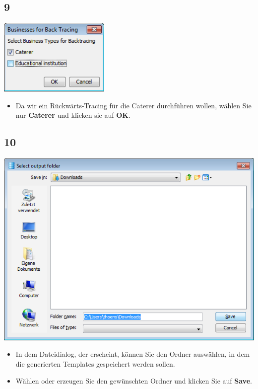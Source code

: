 \documentclass{beamer}
\begin{document}
\subsection{9}
\begin{frame}
	\begin{center}
  		\includegraphics[width=0.4\textwidth]{9.png}
	\end{center}
	\begin{itemize}
		\item Da wir ein Rückwärts-Tracing für die Caterer durchführen wollen, wählen Sie nur \textbf{Caterer} und klicken sie auf \textbf{OK}.
	\end{itemize}
\end{frame}

\subsection{10}
\begin{frame}
	\begin{center}
  		\includegraphics[height=0.5\textheight]{10.png}
	\end{center}
	\begin{itemize}
		\item In dem Dateidialog, der erscheint, können Sie den Ordner auswählen, in dem die generierten Templates gespeichert werden sollen.
		\item Wählen oder erzeugen Sie den gewünschten Ordner und klicken Sie auf \textbf{Save}.
	\end{itemize}
\end{frame}
\end{document}
